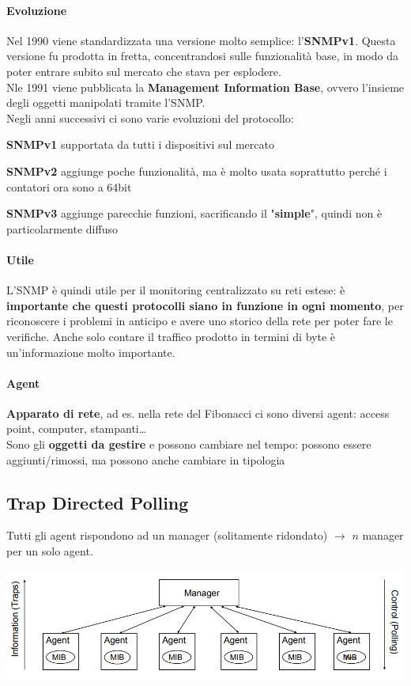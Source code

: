 \documentclass[10pt]{book}
\begin{document}
\paragraph{Evoluzione} Nel 1990 viene standardizzata una versione molto semplice: l'\textbf{SNMPv1}. Questa versione fu prodotta in fretta, concentrandosi sulle funzionalità base, in modo da poter entrare subito sul mercato che stava per esplodere.\\
Nle 1991 viene pubblicata la \textbf{Management Information Base}, ovvero l'insieme degli oggetti manipolati tramite l'SNMP.\\
Negli anni successivi ci sono varie evoluzioni del protocollo:
\begin{list}{}{}
	\item \textbf{SNMPv1} supportata da tutti i dispositivi sul mercato
	\item \textbf{SNMPv2} aggiunge poche funzionalità, ma è molto usata soprattutto perché i contatori ora sono a 64bit
	\item \textbf{SNMPv3} aggiunge parecchie funzioni, sacrificando il "\textbf{simple}", quindi non è particolarmente diffuso
\end{list}
\paragraph{Utile} L'SNMP è quindi utile per il monitoring centralizzato su reti estese: è \textbf{importante che questi protocolli siano in funzione in ogni momento}, per riconoscere i problemi in anticipo e avere uno storico della rete per poter fare le verifiche. Anche solo contare il traffico prodotto in termini di byte è un'informazione molto importante.
\paragraph{Agent} \textbf{Apparato di rete}, ad es. nella rete del Fibonacci ci sono diversi agent: access point, computer, stampanti\ldots\\
Sono gli \textbf{oggetti da gestire} e possono cambiare nel tempo: possono essere aggiunti/rimossi, ma possono anche cambiare in tipologia
\subsection{Trap Directed Polling}
Tutti gli agent rispondono ad un manager (solitamente ridondato) $\rightarrow$ $n$ manager per un solo agent.
\begin{center}
	\includegraphics[scale=0.7]{manageragent.png}
\end{center}
\end{document}
